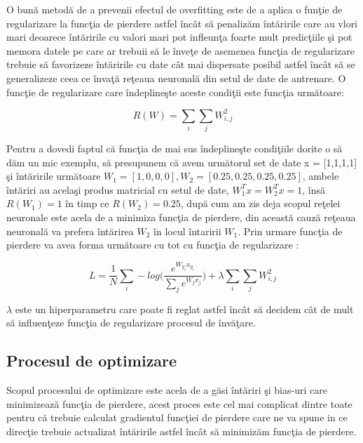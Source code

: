O bun\u{a} metod\u{a} de a prevenii efectul de overfitting este de a aplica o fun\c{t}ie de regularizare la func\c{t}ia de pierdere astfel \^{i}nc\^{a}t s\u{a} penaliz\u{a}m \^{i}nt\u{a}ririle care au vlori mari deoarece \^{i}nt\u{a}ririle cu valori mari pot infleun\c{t}a  foarte mult predic\c{t}iile \c{s}i pot memora datele pe care ar trebuii s\u{a} le \^{i}nve\c{t}e de asemenea func\c{t}ia de regularizare trebuie s\u{a} favorizeze \^{i}nt\u{a}ririle cu date c\^{a}t mai dispersate posibil astfel \^{i}nc\^{a}t s\u{a} se generalizeze ceea ce \^{i}nva\c{t}\u{a} re\c{t}eaua neuronal\u{a} din setul de date de antrenare. O func\c{t}ie de regularizare care \^{i}ndepline\c{s}te aceste condi\c{t}ii este func\c{t}ia urm\u{a}toare:

$$ R(W) = \sum_i \sum_j W_{i,j}^2 $$

Pentru a dovedi faptul c\u{a} func\c{t}ia de mai sus \^{i}ndepline\c{s}te condi\c{t}iile dorite o s\u{a} d\u{a}m un mic exemplu, s\u{a} presupunem c\u{a} avem urm\u{a}torul set de date x = [1,1,1,1] \c{s}i \^{i}nt\u{a}ririle urm\u{a}toare $W_1 = [1,0,0,0], W_2 = [0.25, 0.25, 0.25, 0.25]$, ambele \^{i}nt\u{a}riri au acela\c{s}i produs matricial cu setul de date, $W^T_1 x = W^T_2 x = 1$, \^{i}ns\u{a} $R(W_1) = 1 $ \^{i}n timp ce $R(W_2) = 0.25$, dup\u{a} cum am zis deja scopul re\c{t}elei neuronale este acela de a minimiza func\c{t}ia de pierdere, din aceast\u{a} cauz\u{a} re\c{t}eaua neuronal\u{a} va prefera \^{i}nt\u{a}rirea $W_2$ \^{i}n locul \^{i}ntaririi $W_1$. Prin urmare func\c{t}ia de pierdere va avea forma urm\u{a}toare cu tot cu func\c{t}ia de regularizare :

$$L = \frac{1}{N} \sum_i - log \bigg(\frac{e^{W_y_i x_y_i}}{\sum_j e^{W_j x_j}}\bigg) + \lambda \sum_i \sum_j W_{i,j}^2 $$

$\lambda$ este un hiperparametru care poate fi reglat astfel \^{i}nc\^{a}t s\u{a} decidem c\^{a}t de mult s\u{a} influen\c{t}eze func\c{t}ia de regularizare procesul de \^{i}nv\u{a}\c{t}are.

\subsection{Procesul de optimizare}

Scopul procesului de optimizare este acela de a g\u{a}si  \^{i}nt\u{a}riri \c{s}i bias-uri care minimizeaz\u{a} func\c{t}ia de pierdere, acest proces este cel mai complicat dintre toate pentru c\u{a} trebuie calculat gradientul func\c{t}iei de pierdere care ne va spune in ce direc\c{t}ie trebuie actualizat \^{i}nt\u{a}ririle astfel \^{i}nc\^{a}t s\u{a} minimiz\u{a}m func\c{t}ia de pierdere.

